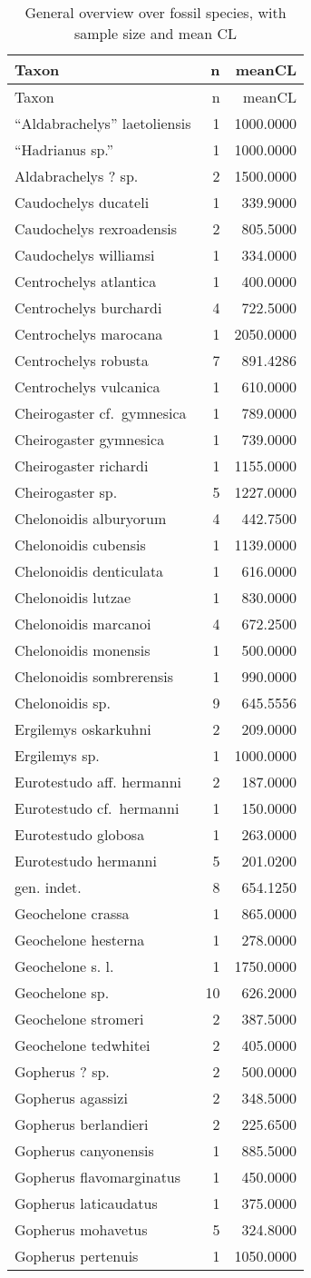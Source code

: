 \begin{longtable}[]{@{}lrr@{}}
	\caption[Species overview]{General overview over fossil species, with sample size and mean
		CL}
	\label{tab:Species}\tabularnewline
	\toprule
	Taxon & n & meanCL\tabularnewline
	\midrule
	\endfirsthead
	\toprule
	Taxon & n & meanCL\tabularnewline
	\midrule
	\endhead
	``Aldabrachelys'' laetoliensis & 1 & 1000.0000\tabularnewline
	``Hadrianus sp.'' & 1 & 1000.0000\tabularnewline
	Aldabrachelys ? sp. & 2 & 1500.0000\tabularnewline
	Caudochelys ducateli & 1 & 339.9000\tabularnewline
	Caudochelys rexroadensis & 2 & 805.5000\tabularnewline
	Caudochelys williamsi & 1 & 334.0000\tabularnewline
	Centrochelys atlantica & 1 & 400.0000\tabularnewline
	Centrochelys burchardi & 4 & 722.5000\tabularnewline
	Centrochelys marocana & 1 & 2050.0000\tabularnewline
	Centrochelys robusta & 7 & 891.4286\tabularnewline
	Centrochelys vulcanica & 1 & 610.0000\tabularnewline
	Cheirogaster cf.~gymnesica & 1 & 789.0000\tabularnewline
	Cheirogaster gymnesica & 1 & 739.0000\tabularnewline
	Cheirogaster richardi & 1 & 1155.0000\tabularnewline
	Cheirogaster sp. & 5 & 1227.0000\tabularnewline
	Chelonoidis alburyorum & 4 & 442.7500\tabularnewline
	Chelonoidis cubensis & 1 & 1139.0000\tabularnewline
	Chelonoidis denticulata & 1 & 616.0000\tabularnewline
	Chelonoidis lutzae & 1 & 830.0000\tabularnewline
	Chelonoidis marcanoi & 4 & 672.2500\tabularnewline
	Chelonoidis monensis & 1 & 500.0000\tabularnewline
	Chelonoidis sombrerensis & 1 & 990.0000\tabularnewline
	Chelonoidis sp. & 9 & 645.5556\tabularnewline
	Ergilemys oskarkuhni & 2 & 209.0000\tabularnewline
	Ergilemys sp. & 1 & 1000.0000\tabularnewline
	Eurotestudo aff. hermanni & 2 & 187.0000\tabularnewline
	Eurotestudo cf.~hermanni & 1 & 150.0000\tabularnewline
	Eurotestudo globosa & 1 & 263.0000\tabularnewline
	Eurotestudo hermanni & 5 & 201.0200\tabularnewline
	gen. indet. & 8 & 654.1250\tabularnewline
	Geochelone crassa & 1 & 865.0000\tabularnewline
	Geochelone hesterna & 1 & 278.0000\tabularnewline
	Geochelone s. l. & 1 & 1750.0000\tabularnewline
	Geochelone sp. & 10 & 626.2000\tabularnewline
	Geochelone stromeri & 2 & 387.5000\tabularnewline
	Geochelone tedwhitei & 2 & 405.0000\tabularnewline
	Gopherus ? sp. & 2 & 500.0000\tabularnewline
	Gopherus agassizi & 2 & 348.5000\tabularnewline
	Gopherus berlandieri & 2 & 225.6500\tabularnewline
	Gopherus canyonensis & 1 & 885.5000\tabularnewline
	Gopherus flavomarginatus & 1 & 450.0000\tabularnewline
	Gopherus laticaudatus & 1 & 375.0000\tabularnewline
	Gopherus mohavetus & 5 & 324.8000\tabularnewline
	Gopherus pertenuis & 1 & 1050.0000\tabularnewline

\end{longtable}
